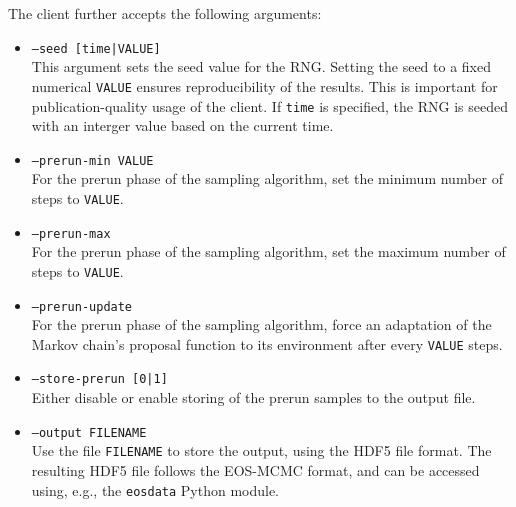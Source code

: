 The  client further accepts the following arguments:
\begin{itemize}
    \item[] \texttt{--seed [time|VALUE]}\\[\medskipamount]
        This argument sets the seed value for the \gls{RNG}. Setting the
        seed to a fixed numerical \texttt{VALUE} ensures reproducibility of the results. This
        is important for publication-quality usage of the client. If \texttt{time} is
        specified, the \gls{RNG} is seeded with an interger value based on the current time.

    \item[] \texttt{--prerun-min VALUE}\\[\medskipamount]
        For the prerun phase of the sampling algorithm, set the minimum number of
        steps to \texttt{VALUE}.

    \item[] \texttt{--prerun-max}\\[\medskipamount]
        For the prerun phase of the sampling algorithm, set the maximum number of
        steps to \texttt{VALUE}.

    \item[] \texttt{--prerun-update}\\[\medskipamount]
        For the prerun phase of the sampling algorithm, force an adaptation of the
        Markov chain's proposal function to its environment after every \texttt{VALUE}
        steps.

    \item[] \texttt{--store-prerun [0|1]}\\[\medskipamount]
        Either disable or enable storing of the prerun samples to the output file.\\

    \item[] \texttt{--output FILENAME}\\[\medskipamount]
        Use the file \texttt{FILENAME} to store the output, using the HDF5 file format.
        The resulting HDF5 file follows the EOS-MCMC format, and can be accessed using, e.g.,
        the \texttt{eosdata} Python module.
\end{itemize}

